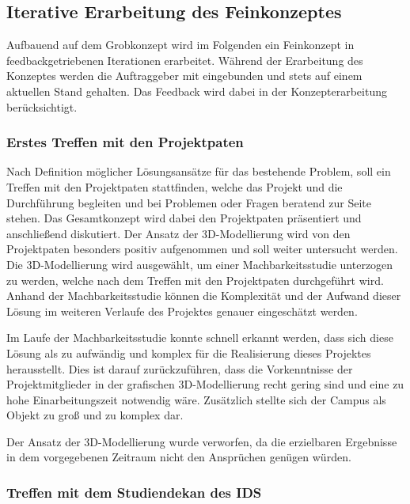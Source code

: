 \subsection{Iterative Erarbeitung des Feinkonzeptes}
\label{sec:ErarbeitungFeinkonzept}

Aufbauend auf dem Grobkonzept wird im Folgenden ein Feinkonzept in
feedbackgetriebenen Iterationen erarbeitet.
Während der Erarbeitung des Konzeptes werden die Auftraggeber mit eingebunden und stets auf einem aktuellen
Stand gehalten. Das Feedback wird dabei in der Konzepterarbeitung berücksichtigt.

\subsubsection*{Erstes Treffen mit den Projektpaten}
\label{sec:Treffen1}

Nach Definition möglicher Lösungsansätze für das bestehende Problem, soll ein Treffen 
mit den Projektpaten stattfinden, welche das Projekt und die Durchführung begleiten 
und bei Problemen oder Fragen beratend zur Seite stehen. Das Gesamtkonzept wird dabei 
den Projektpaten präsentiert und anschließend diskutiert. Der Ansatz der 3D-Modellierung wird von den 
Projektpaten besonders positiv aufgenommen und soll weiter untersucht werden. 
Die 3D-Modellierung wird ausgewählt, um einer Machbarkeitsstudie unterzogen zu werden, welche nach dem Treffen mit den 
Projektpaten durchgeführt wird. Anhand der Machbarkeitsstudie können die Komplexität und der Aufwand dieser Lösung im 
weiteren Verlaufe des Projektes genauer eingeschätzt werden.

Im Laufe der Machbarkeitsstudie konnte schnell erkannt werden, dass sich diese Lösung 
als zu aufwändig und komplex für die 
Realisierung dieses Projektes herausstellt. Dies ist darauf zurückzuführen, dass die Vorkenntnisse der Projektmitglieder 
in der grafischen 3D-Modellierung recht gering sind und eine zu hohe Einarbeitungszeit notwendig wäre. Zusätzlich stellte 
sich der Campus als Objekt zu groß und zu komplex dar. 

Der Ansatz der 3D-Modellierung wurde verworfen, da die erzielbaren Ergebnisse in dem vorgegebenen Zeitraum nicht den 
Ansprüchen genügen würden.


\subsubsection*{Treffen mit dem Studiendekan des IDS}
\label{sec:Treffen2}


